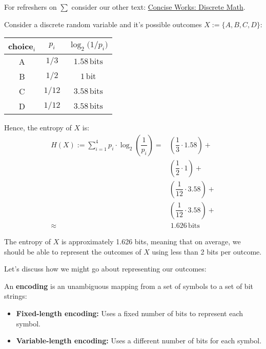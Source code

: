 \begin{Tip} For refreshers on $\sum$ consider our other text:
    \href{https://github.com/Concise-Works/Discrete-Math}{Concise Works: Discrete Math}.
\end{Tip}

\newpage 
\begin{Example}

    \label{ex:entropy_four}

    Consider a discrete random variable and it's possible outcomes $X:=\{A,B,C,D\}$:

    \begin{center}
        
        \begin{tabular}{c c c}
          \toprule
          choice$_i$ & $p_i$ & $\log_2\bigl(1/p_i\bigr)$ \\
          \midrule
          A & $\displaystyle 1/3$  & $1.58\,\mathrm{bits}$ \\
          B & $\displaystyle 1/2$  & $1\,\mathrm{bit}$    \\
          C & $\displaystyle 1/12$ & $3.58\,\mathrm{bits}$ \\
          D & $\displaystyle 1/12$ & $3.58\,\mathrm{bits}$ \\
          \bottomrule
        \end{tabular}
    \end{center}

    \noindent
    Hence, the entropy of $X$ is:
    \begin{align*}
        H(X) := \sum_{i=1}^{4} p_i \cdot \log_2\left(\dfrac{1}{p_i}\right)= & \left(\dfrac{1}{3} \cdot 1.58\right) +\\
        &\left(\dfrac{1}{2} \cdot 1\right) +\\
        &\left(\dfrac{1}{12} \cdot 3.58\right) +\\
        &\left(\dfrac{1}{12} \cdot 3.58\right) +\\
        \approx &\ 1.626\,\mathrm{bits}
    \end{align*}

    \noindent 
    The entropy of $X$ is approximately 1.626 bits, meaning that on average, we should be able to represent the outcomes of $X$ 
    using less than 2 bits per outcome.

\end{Example}

\noindent
Let's discuss how we might go about representing our outcomes:
\begin{Def}[Encoding]

    \label{def:encoding}
    
        An \textbf{encoding} is an unambiguous mapping from a set of symbols to a set of bit strings:
        \begin{itemize}
                \item \textbf{Fixed-length encoding:} Uses a fixed number of bits to represent each symbol.
                \item \textbf{Variable-length encoding:} Uses a different number of bits for each symbol.
        \end{itemize}
\end{Def}

\newpage 



